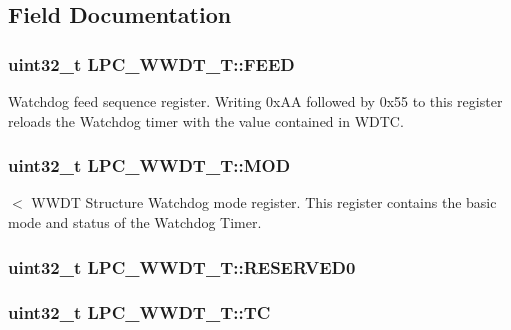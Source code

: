 \subsection{Field Documentation}
\hypertarget{structLPC__WWDT__T_a80b357a30f90ba82fd46ff1faa8fe4b8}{
\subsubsection[{F\-E\-E\-D}]{ uint32\-\_\-t L\-P\-C\-\_\-\-W\-W\-D\-T\-\_\-\-T\-::\-F\-E\-E\-D}}\label{structLPC__WWDT__T_a80b357a30f90ba82fd46ff1faa8fe4b8}
Watchdog feed sequence register. Writing 0x\-A\-A followed by 0x55 to this register reloads the Watchdog timer with the value contained in W\-D\-T\-C. \hypertarget{structLPC__WWDT__T_a92ea6cd2032ed81f7c5f626b48c4c772}{
\subsubsection[{M\-O\-D}]{ uint32\-\_\-t L\-P\-C\-\_\-\-W\-W\-D\-T\-\_\-\-T\-::\-M\-O\-D}}\label{structLPC__WWDT__T_a92ea6cd2032ed81f7c5f626b48c4c772}
$<$ W\-W\-D\-T Structure Watchdog mode register. This register contains the basic mode and status of the Watchdog Timer. \hypertarget{structLPC__WWDT__T_af47cdcbd1ae7b068bf6b66566a140aa6}{
\subsubsection[{R\-E\-S\-E\-R\-V\-E\-D0}]{ uint32\-\_\-t L\-P\-C\-\_\-\-W\-W\-D\-T\-\_\-\-T\-::\-R\-E\-S\-E\-R\-V\-E\-D0}}\label{structLPC__WWDT__T_af47cdcbd1ae7b068bf6b66566a140aa6}
\hypertarget{structLPC__WWDT__T_a8390ac91aea3330b363ad2fd5dc97f98}{
\subsubsection[{T\-C}]{ uint32\-\_\-t L\-P\-C\-\_\-\-W\-W\-D\-T\-\_\-\-T\-::\-T\-C}}\label{structLPC__WWDT__T_a8390ac91aea3330b363ad2fd5dc97f98}
